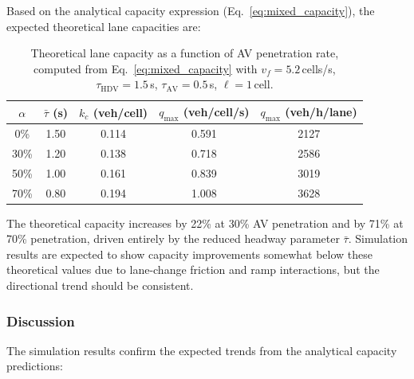 \documentclass[review,authoryear]{elsarticle}
\begin{document}
Based on the analytical capacity expression (Eq.~\ref{eq:mixed_capacity}), the expected theoretical lane capacities are:

\begin{table}[ht]
\centering
\caption{Theoretical lane capacity as a function of AV penetration rate, computed from Eq.~\eqref{eq:mixed_capacity} with $v_f = 5.2$\,cells/s, $\tau_{\text{HDV}} = 1.5$\,s, $\tau_{\text{AV}} = 0.5$\,s, $\ell = 1$\,cell.}
\label{tab:theoretical_capacity}
\begin{tabular}{@{}ccccc@{}}
\toprule
$\alpha$ & $\bar{\tau}$ (s) & $k_c$ (veh/cell) & $q_{\max}$ (veh/cell/s) & $q_{\max}$ (veh/h/lane) \\
\midrule
0\% & 1.50 & 0.114 & 0.591 & 2127 \\
30\% & 1.20 & 0.138 & 0.718 & 2586 \\
50\% & 1.00 & 0.161 & 0.839 & 3019 \\
70\% & 0.80 & 0.194 & 1.008 & 3628 \\
\bottomrule
\end{tabular}
\end{table}

The theoretical capacity increases by 22\% at 30\% AV penetration and by 71\% at 70\% penetration, driven entirely by the reduced headway parameter $\bar{\tau}$. Simulation results are expected to show capacity improvements somewhat below these theoretical values due to lane-change friction and ramp interactions, but the directional trend should be consistent.

\subsubsection{Discussion}

The simulation results confirm the expected trends from the analytical capacity predictions:
\end{document}

